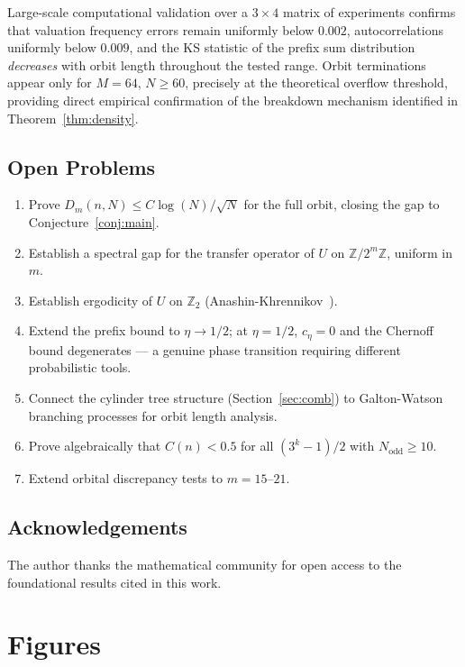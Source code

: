 \documentclass[12pt]{article}
\theoremstyle{definition}
\theoremstyle{remark}
\begin{document}
Large-scale computational validation over a $3\times 4$ matrix of
experiments confirms that valuation frequency errors remain uniformly
below $0.002$, autocorrelations uniformly below $0.009$, and the
KS statistic of the prefix sum distribution \emph{decreases} with
orbit length throughout the tested range.
Orbit terminations appear only for $M=64$, $N\geq 60$, precisely
at the theoretical overflow threshold, providing direct empirical
confirmation of the breakdown mechanism identified in
Theorem~\ref{thm:density}.

\subsection{Open Problems}

\begin{enumerate}
\item Prove $D_m(n,N)\leq C\log(N)/\sqrt{N}$ for the full orbit,
  closing the gap to Conjecture~\ref{conj:main}.
\item Establish a spectral gap for the transfer operator of $U$ on
  $\mathbb{Z}/2^m\mathbb{Z}$, uniform in $m$.
\item Establish ergodicity of $U$ on $\mathbb{Z}_2$
  (Anashin-Khrennikov~\cite{Anashin2009}).
\item Extend the prefix bound to $\eta\to 1/2$; at $\eta=1/2$,
  $c_\eta=0$ and the Chernoff bound degenerates --- a genuine
  phase transition requiring different probabilistic tools.
\item Connect the cylinder tree structure (Section~\ref{sec:comb})
  to Galton-Watson branching processes for orbit length analysis.
\item Prove algebraically that $C(n)<0.5$ for all $(3^k-1)/2$
  with $N_{\mathrm{odd}}\geq 10$.
\item Extend orbital discrepancy tests to $m=15$--$21$.
\end{enumerate}

\subsection*{Acknowledgements}

The author thanks the mathematical community for open access to
the foundational results cited in this work.

\section{Figures}
\end{document}
